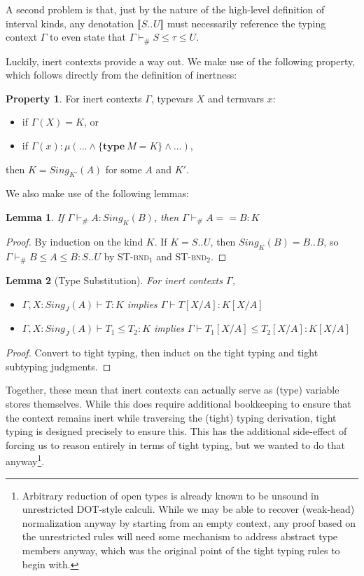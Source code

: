 \documentclass[a4paper, 10pt]{article}
\newcommand{\interval}[3][]{#2 .._{#1} #3}
\newcommand{\subst}[3]{#1[#2/#3]}
\newcommand{\objval}[3]{\{ \textbf{#1}\ #2 = #3 \}}
\newcommand{\KDenot}[1]{\llbracket #1 \rrbracket}
\newcommand{\Sing}[2]{Sing_{#2}(#1)}
\newtheorem{lemma}{Lemma}
\theoremstyle{definition}
\newtheorem{property}{Property}
\begin{document}
A second problem is that, just by the nature of the high-level definition of
interval kinds, any denotation $\KDenot{\interval{S}{U}}$ must necessarily
reference the typing context $\Gamma$ to even state that $\Gamma \vdash_\# S
\le \tau \le U$.

Luckily, inert contexts provide a way out. We make use of the following
property, which follows directly from the definition of inertness:
\begin{property}
  For inert contexts $\Gamma$, typevars $X$ and termvars $x$:
  \begin{itemize}
    \item if $\Gamma(X) = K$, or
    \item if $\Gamma(x) : \mu(\dots \land \objval{type}{M}{K} \land \dots)$,
  \end{itemize}
  then $K = \Sing{A}{K'}$ for some $A$ and $K'$.
\end{property}

We also make use of the following lemmas:
\begin{lemma}\label{lemma:sing-defn}
  If $\Gamma \vdash_\# A : \Sing{B}{K}$, then $\Gamma \vdash_\# A == B : K$
\end{lemma}
\begin{proof}
  By induction on the kind $K$. If $K = \interval{S}{U}$, then $\Sing{B}{K}=
  \interval{B}{B}$, so $\Gamma \vdash_\# B \le A \le B : \interval{S}{U}$ by
  \textsc{ST-bnd}$_1$ and \textsc{ST-bnd}$_2$.
\end{proof}
\begin{lemma}[Type Substitution]\label{lemma:typesubst}
  For inert contexts $\Gamma$,
  \begin{itemize}
    \item $\Gamma, X: \Sing{A}{J} \vdash T : K$ implies
      $\Gamma \vdash \subst{T}{X}{A} : \subst{K}{X}{A}$
    \item $\Gamma, X: \Sing{A}{J} \vdash T_1 \le T_2 : K$ implies
      $\Gamma \vdash \subst{T_1}{X}{A} \le \subst{T_2}{X}{A} : \subst{K}{X}{A}$
  \end{itemize}
\end{lemma}
\begin{proof}
  Convert to tight typing, then induct on the tight typing and tight subtyping
  judgments.
\end{proof}

Together, these mean that inert contexts can actually serve as (type) variable
stores themselves. While this does require additional bookkeeping to ensure
that the context remains inert while traversing the (tight) typing derivation,
tight typing is designed precisely to ensure this. This has the additional
side-effect of forcing us to reason entirely in terms of tight typing, but we
wanted to do that anyway\footnote{Arbitrary reduction of open types is already
known to be unsound in unrestricted DOT-style calculi. While we may be able to
recover (weak-head) normalization anyway by starting from an empty context, any
proof based on the unrestricted rules will need some mechanism to address
abstract type members anyway, which was the original point of the tight typing
rules to begin with.}.
\end{document}
